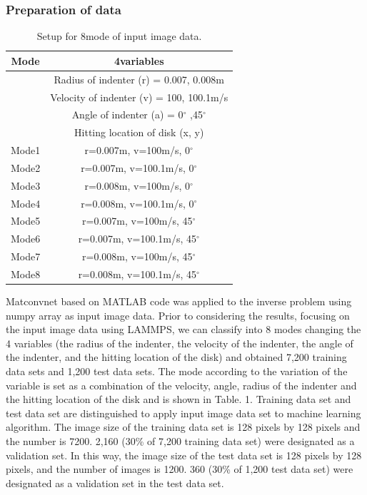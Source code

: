 \subsubsection{Preparation of data}
\label{subsubsec1}
\begin{table}[h!]
\centering
\caption{Setup for 8mode of input image data.}
\label{tab:1}       
\begin{tabular}{c|c}
\hline
\hline
Mode & 4variables \\
\hline
 & Radius of indenter (r) = 0.007, 0.008m \\
 & Velocity of indenter (v) = 100, 100.1m/s \\
 & Angle of indenter (a) = 0$^{\circ}$ ,45$^{\circ}$  \\
 & Hitting location of disk (x, y) \\
 \hline
Mode1 & r=0.007m, v=100m/s, 0$^{\circ}$ \\
Mode2 & r=0.007m, v=100.1m/s, 0$^{\circ}$ \\
Mode3 & r=0.008m, v=100m/s, 0$^{\circ}$ \\
Mode4 & r=0.008m, v=100.1m/s, 0$^{\circ}$ \\
Mode5 & r=0.007m, v=100m/s, 45$^{\circ}$ \\
Mode6 & r=0.007m, v=100.1m/s, 45$^{\circ}$ \\
Mode7 & r=0.008m, v=100m/s, 45$^{\circ}$ \\
Mode8 & r=0.008m, v=100.1m/s, 45$^{\circ}$ \\
\hline
\end{tabular}
\end{table}
Matconvnet \cite{Ref19} based on MATLAB code was applied to the inverse problem using numpy array as input image data. Prior to considering the results, focusing on the input image data using LAMMPS, we can classify into 8 modes changing the 4 variables (the radius of the indenter, the velocity of the indenter, the angle of the indenter, and the hitting location of the disk) and obtained 7,200 training data sets and 1,200 test data sets. The mode according to the variation of the variable is set as a combination of the velocity, angle, radius of the indenter and the hitting location of the disk and is shown in Table. 1. Training data set and test data set are distinguished to apply input image data set to machine learning algorithm. The image size of the training data set is 128 pixels by 128 pixels and the number is 7200. 2,160 (30\% of 7,200 training data set) were designated as a validation set. In this way, the image size of the test data set is 128 pixels by 128 pixels, and the number of images is 1200. 360 (30\% of 1,200 test data set) were designated as a validation set in the test data set.
